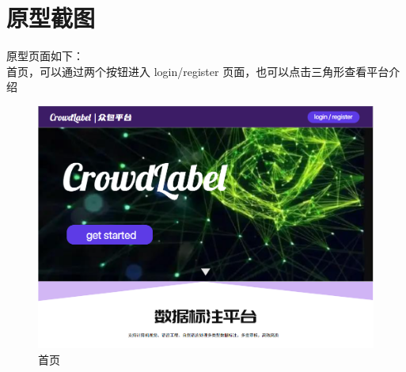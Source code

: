 \section{原型截图} \label{sec:proto_scrn}

原型页面如下：\\

首页，可以通过两个按钮进入 login/register 页面，也可以点击三角形查看平台介绍

\begin{figure}[h!]
    \centering
    \includegraphics[width=\linewidth]{imgs/prototype/home.png}
    \caption{首页}
    \label{fig:proto_home}
\end{figure}

